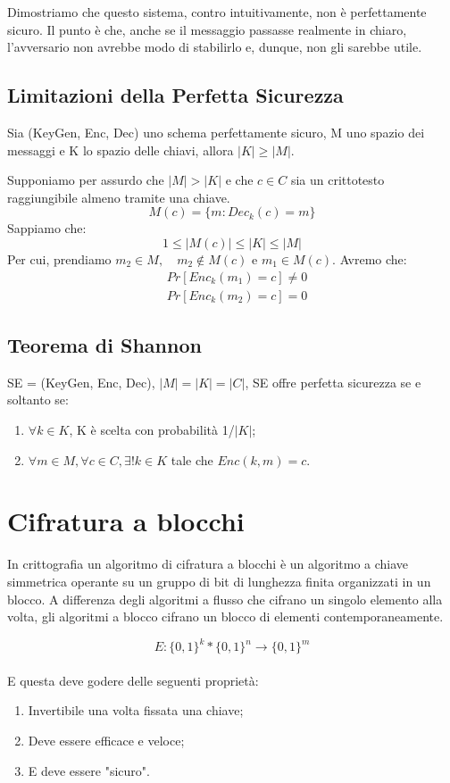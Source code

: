 Dimostriamo che questo sistema, contro intuitivamente, non è perfettamente sicuro. Il punto è che, anche se il messaggio passasse realmente in chiaro, l'avversario non avrebbe modo di stabilirlo e, dunque, non gli sarebbe utile. 

\section{Limitazioni della Perfetta Sicurezza}
Sia (KeyGen, Enc, Dec) uno schema perfettamente sicuro, M uno spazio dei messaggi e K lo spazio delle chiavi, allora $|K| \ge |M|$.

Supponiamo per assurdo che $|M| > |K|$ e che $c\in C$ sia un crittotesto raggiungibile almeno tramite una chiave. 
\[M(c) = \{m:Dec_k(c)=m\}\]
Sappiamo che:
\[1\leq |M(c)| \leq |K| \leq |M|\]
Per cui, prendiamo $m_2\in M ,\quad m_2\notin M(c)$ e $m_1\in M(c)$. Avremo che: 
\begin{align*}
    &Pr[Enc_k(m_1)=c] \neq0\\
    &Pr[Enc_k(m_2)=c]  = 0
\end{align*}
\section{Teorema di Shannon}
SE = (KeyGen, Enc, Dec), $|M|=|K|=|C|$, SE offre perfetta sicurezza se e soltanto se:
\begin{enumerate}
    \item $\forall k \in K$, K è scelta con probabilità 1/$|K|$;
    \item $\forall m \in M, \forall c\in C, \exists! k\in K$ tale che $Enc(k,m) = c$.
\end{enumerate}

\chapter{Cifratura a blocchi}
In crittografia un algoritmo di cifratura a blocchi è un algoritmo a chiave simmetrica operante su un gruppo di bit di lunghezza finita organizzati in un blocco. A differenza degli algoritmi a flusso che cifrano un singolo elemento alla volta, gli algoritmi a blocco cifrano un blocco di elementi contemporaneamente.

\[E: \{0,1\}^k * \{0,1\}^n \xrightarrow{} \{0,1\}^m\]
\\
E questa deve godere delle seguenti proprietà:
\begin{enumerate}
    \item Invertibile una volta fissata una chiave;
    \item Deve essere efficace e veloce;
    \item E deve essere "sicuro". 
\end{enumerate}

